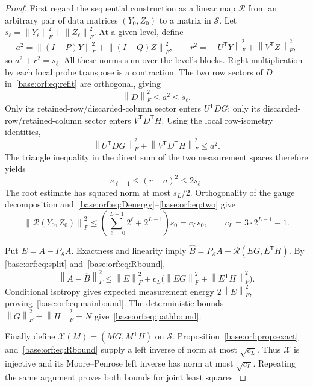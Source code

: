\documentclass[11pt,oneside,openany,a4paper]{book}
\numberwithin{equation}{chapter}
\theoremstyle{definition}
\theoremstyle{remark}
\newcommand{\T}{\mathsf T}\newcommand{\Id}{I}
\newcommand{\F}[1]{\left\lVert#1\right\rVert_F}
\begin{document}
\begin{proof}
First regard the sequential construction as a linear map $\mathcal R$ from
an arbitrary pair of data matrices $(Y_0,Z_0)$ to a matrix in $\mathcal S$.
Let $s_\ell=\F{Y_\ell}^2+\F{Z_\ell}^2$. At a given level, define
\[
 a^2=\F{(I-P)Y}^2+\F{(I-Q)Z}^2,\qquad
 r^2=\F{U^{\T}Y}^2+\F{V^{\T}Z}^2,
\]
so $a^2+r^2=s_\ell$. All these norms sum over the level's blocks.
Right multiplication by each local probe transpose is a contraction.
The two row sectors of $D$ in~\eqref{base:orf:eq:refit} are orthogonal, giving
\begin{equation}\label{base:orf:eq:Denergy}
 \F D^2\le a^2\le s_\ell.
\end{equation}
Only its retained-row/discarded-column sector enters $U^{\T}DG$; only
its discarded-row/retained-column sector enters $V^{\T}D^{\T}H$.
Using the local row-isometry identities,
\[
 \F{U^{\T}DG}^2+\F{V^{\T}D^{\T}H}^2\le a^2.
\]
The triangle inequality in the direct sum of the two measurement spaces
therefore yields
\begin{equation}\label{base:orf:eq:two}
 s_{\ell+1}\le(r+a)^2\le2s_\ell.
\end{equation}
The root estimate has squared norm at most $s_L/2$. Orthogonality of the
gauge decomposition and~\eqref{base:orf:eq:Denergy}--\eqref{base:orf:eq:two} give
\begin{equation}\label{base:orf:eq:Rbound}
 \F{\mathcal R(Y_0,Z_0)}^2
 \le\left(\sum_{\ell=0}^{L-1}2^\ell+2^{L-1}\right)s_0
 =c_Ls_0,\qquad c_L=3\cdot2^{L-1}-1.
\end{equation}

Put $E=A-P_{\mathcal S}A$. Exactness and linearity imply
$\widehat B=P_{\mathcal S}A+\mathcal R(EG,E^{\T}H)$. By
\eqref{base:orf:eq:split} and~\eqref{base:orf:eq:Rbound},
\[
 \F{A-\widehat B}^2\le\F E^2
       +c_L\bigl(\F{EG}^2+\F{E^{\T}H}^2\bigr).
\]
Conditional isotropy gives expected measurement energy $2\F E^2$,
proving~\eqref{base:orf:eq:mainbound}. The deterministic bounds
$\F G^2=\F H^2=N$ give~\eqref{base:orf:eq:pathbound}.

Finally define $\mathcal X(M)=(MG,M^{\T}H)$ on $\mathcal S$.
Proposition~\ref{base:orf:prop:exact} and~\eqref{base:orf:eq:Rbound} supply a left inverse
of norm at most $\sqrt{c_L}$. Thus $\mathcal X$ is injective and its
Moore--Penrose left inverse has norm at most $\sqrt{c_L}$. Repeating the
same argument proves both bounds for joint least squares.
\end{proof}
\end{document}

